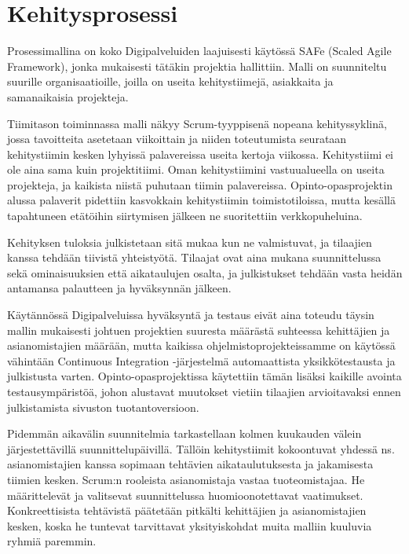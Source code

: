 \documentclass[11pt]{article}
\begin{document}
\section{Kehitysprosessi}

Prosessimallina on koko Digipalveluiden laajuisesti käytössä SAFe (Scaled Agile
Framework), jonka mu\-kai\-ses\-ti tätäkin projektia hallittiin. Malli on
suunniteltu suurille organisaatioille, joilla on useita kehitystiimejä,
asiakkaita ja samanaikaisia projekteja.

Tiimitason toiminnassa malli näkyy Scrum-tyyppisenä nopeana kehityssyklinä,
jossa tavoitteita ase\-tetaan viikoittain ja niiden toteutumista seurataan
kehitystiimin kesken lyhyissä palavereissa useita kertoja viikossa.
Kehitystiimi ei ole aina sama kuin projektitiimi. Oman kehitystiimini
vastuualueella on useita projekteja, ja kaikista niistä puhutaan tiimin
palave\-reis\-sa. Opinto-opasprojektin alussa palaverit pidettiin kasvokkain kehitystiimin
toimisto\-tiloissa, mutta kesällä tapahtuneen etätöihin siirtymisen jälkeen ne
suoritettiin verkko\-puheluina.

Kehityksen tuloksia julkistetaan sitä mukaa kun ne valmistuvat, ja
tilaajien kanssa tehdään tiivistä yhteis\-työtä. Tilaajat ovat aina mukana
suunnittelussa sekä ominaisuuksien että aika\-tau\-lujen osalta, ja julkistukset
tehdään vasta heidän antamansa palautteen ja hyväksynnän jälkeen.

Käytännössä Digipalveluissa hyväksyntä ja testaus eivät aina toteudu täysin
mallin mukai\-sesti johtuen projektien suuresta määrästä suhteessa kehittäjien ja
asianomistajien mää\-rään, mutta kaikissa ohjel\-mistoprojekteissamme on käytössä
vähintään Continuous Integration -järjestelmä automaattista yksikkö\-testausta
ja julkistusta varten. Opinto-opas\-pro\-jek\-tissa käytettiin tämän lisäksi kaikille
avointa testausympäristöä, johon alustavat muutokset vie\-tiin tilaajien
arvioitavaksi ennen julkistamista sivuston tuotantoversioon.

Pidemmän aikavälin suunnitelmia tarkastellaan kolmen kuukauden välein
järjestettävillä suunnit\-te\-lu\-päivillä. Tällöin kehitystiimit kokoontuvat
yhdessä ns. asianomistajien kanssa sopimaan tehtävien aikataulutuksesta ja
jakamisesta tiimien kesken. Scrum:n rooleista asi\-an\-omistaja vastaa
tuoteomistajaa. He määrittelevät ja valitsevat suunnittelussa huomioon\-otettavat
vaatimukset. Konkreettisista tehtävis\-tä päätetään pit\-käl\-ti
kehittäjien ja asiano\-mistajien kes\-ken, koska he tuntevat tarvittavat
yksityis\-koh\-dat muita malliin kuuluvia ryhmiä paremmin.
\end{document}
